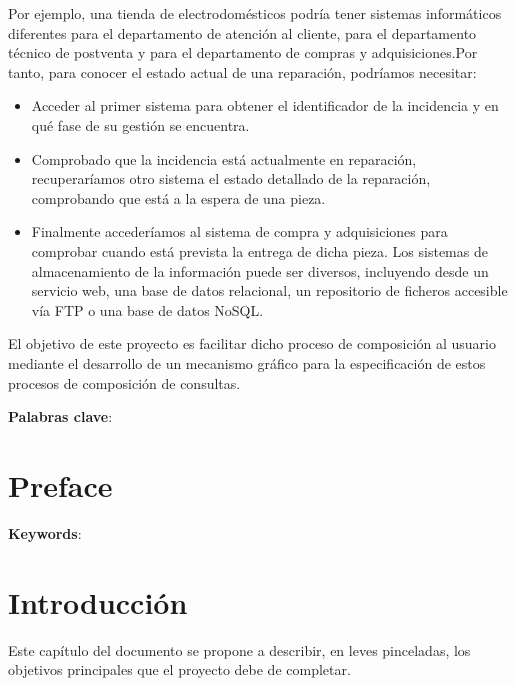 \documentclass[a4paper,12pt]{book}
\begin{document}
	Por ejemplo, una tienda de electrodomésticos podría tener sistemas informáticos diferentes para el departamento de atención al cliente, para el departamento técnico de postventa y para el departamento de compras y adquisiciones.Por tanto, para conocer el estado actual de una reparación, podríamos necesitar:
		\begin{itemize}
			\item  Acceder al primer sistema para obtener el identificador de la incidencia y en qué fase de su gestión se encuentra.
			\item  Comprobado que la incidencia está actualmente en reparación, recuperaríamos otro sistema el estado detallado de la reparación, comprobando que está a la espera de una pieza.
			\item Finalmente accederíamos al sistema de compra y adquisiciones para comprobar cuando está prevista la entrega de dicha pieza. Los sistemas de almacenamiento de la información puede ser diversos, incluyendo desde un servicio web, una base de datos relacional, un repositorio de ficheros accesible vía FTP o una base de datos NoSQL.
		\end{itemize}
	
	\vspace{5mm}
	
	El objetivo de este proyecto es facilitar dicho proceso de composición al usuario mediante el desarrollo de un mecanismo gráfico para la especificación de estos procesos de composición de consultas.
	

	\vspace{5mm}
	
	\textbf{Palabras clave}: 
	\cleardoublepage
	
	\afterpage{\null\newpage}
	\newpage
	
	\chapter*{Preface}

	

	\textbf{Keywords}:
	\cleardoublepage
	
	\setcounter{page}{1}
	
	\afterpage{\null\newpage}
	\newpage
	
	\chapter{Introducción}
	
	Este capítulo del documento se propone a describir, en leves pinceladas, los objetivos principales que el proyecto debe de completar.
	
\end{document}
